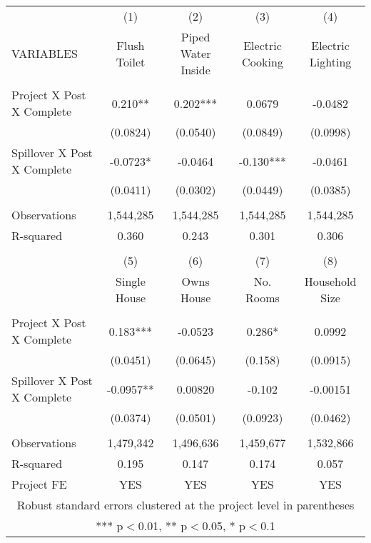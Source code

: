 \begin{tabular}{lcccc} \hline
 & (1) & (2) & (3) & (4)  \\
VARIABLES & Flush Toilet & Piped Water Inside & Electric Cooking & Electric Lighting \\ \hline
 &  &  &  &   \\
Project X Post X Complete & 0.210** & 0.202*** & 0.0679 & -0.0482 \\
 & (0.0824) & (0.0540) & (0.0849) & (0.0998)  \\
 Spillover X Post X Complete & -0.0723* & -0.0464 & -0.130*** & -0.0461 \\
 & (0.0411) & (0.0302) & (0.0449) & (0.0385) \\
    &  &  &  &  \\
    Observations & 1,544,285 & 1,544,285 & 1,544,285 & 1,544,285  \\
R-squared & 0.360 & 0.243 & 0.301 & 0.306  \\ \hline
    &  &  &  &  \\
  & (5) & (6) & (7) & (8) \\
 & Single House & Owns House & No. Rooms & Household Size \\ \hline
   &  &  &  &  \\
Project X Post X Complete  & 0.183*** & -0.0523 & 0.286* & 0.0992 \\
  & (0.0451) & (0.0645) & (0.158) & (0.0915) \\
 Spillover X Post X Complete  & -0.0957** & 0.00820 & -0.102 & -0.00151 \\
 & (0.0374) & (0.0501) & (0.0923) & (0.0462) \\
   &  &  &  &  \\
Observations  & 1,479,342 & 1,496,636 & 1,459,677 & 1,532,866 \\
R-squared  & 0.195 & 0.147 & 0.174 & 0.057 \\
 Project FE & YES & YES & YES & YES \\ \hline
\multicolumn{5}{c}{ Robust standard errors clustered at the project level in parentheses} \\
\multicolumn{5}{c}{ *** p$<$0.01, ** p$<$0.05, * p$<$0.1} \\
\end{tabular}

